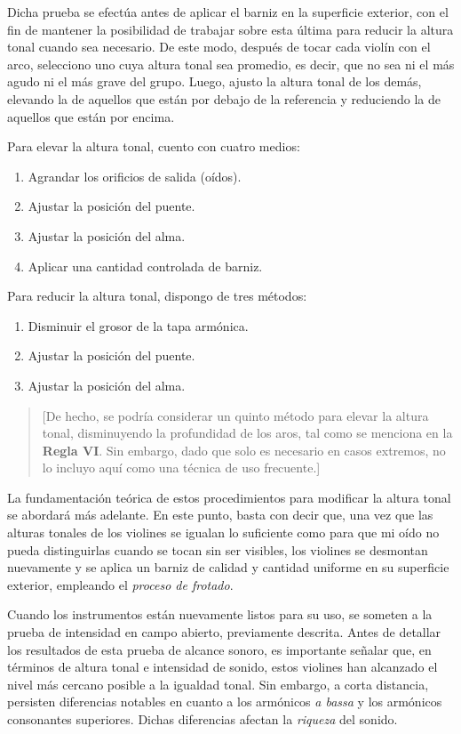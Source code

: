 \documentclass[12pt]{book}
\begin{document}
Dicha prueba se efectúa antes de aplicar el barniz en la superficie exterior, con el fin de mantener la posibilidad de trabajar sobre esta última para reducir la altura tonal cuando sea necesario. De este modo, después de tocar cada violín con el arco, selecciono uno cuya altura tonal sea promedio, es decir, que no sea ni el más agudo ni el más grave del grupo. Luego, ajusto la altura tonal de los demás, elevando la de aquellos que están por debajo de la referencia y reduciendo la de aquellos que están por encima. 

Para elevar la altura tonal, cuento con cuatro medios:

\begin{enumerate}
    \item Agrandar los orificios de salida (oídos).
    \item Ajustar la posición del puente.
    \item Ajustar la posición del alma.
    \item Aplicar una cantidad controlada de barniz.
\end{enumerate}

Para reducir la altura tonal, dispongo de tres métodos:

\begin{enumerate}
    \item Disminuir el grosor de la tapa armónica.
    \item Ajustar la posición del puente.
    \item Ajustar la posición del alma.
\end{enumerate}

\begin{quote}
[De hecho, se podría considerar un quinto método para elevar la altura tonal, disminuyendo la profundidad de los aros, tal como se menciona en la \textbf{Regla VI}. Sin embargo, dado que solo es necesario en casos extremos, no lo incluyo aquí como una técnica de uso frecuente.]
\end{quote}

La fundamentación teórica de estos procedimientos para modificar la altura tonal se abordará más adelante. En este punto, basta con decir que, una vez que las alturas tonales de los violines se igualan lo suficiente como para que mi oído no pueda distinguirlas cuando se tocan sin ser visibles, los violines se desmontan nuevamente y se aplica un barniz de calidad y cantidad uniforme en su superficie exterior, empleando el \textit{proceso de frotado}.

Cuando los instrumentos están nuevamente listos para su uso, se someten a la prueba de intensidad en campo abierto, previamente descrita. Antes de detallar los resultados de esta prueba de alcance sonoro, es importante señalar que, en términos de altura tonal e intensidad de sonido, estos violines han alcanzado el nivel más cercano posible a la igualdad tonal. Sin embargo, a corta distancia, persisten diferencias notables en cuanto a los armónicos \textit{a bassa} y los armónicos consonantes superiores. Dichas diferencias afectan la \textit{riqueza} del sonido.
\end{document}
